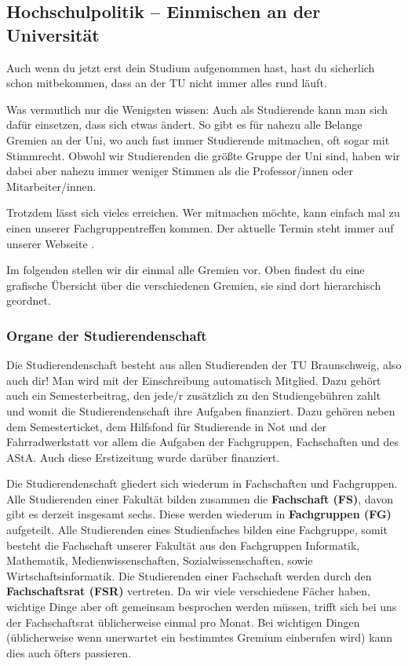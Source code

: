 
\subsection{Hochschulpolitik -- Einmischen an der Universität}

Auch wenn du jetzt erst dein Studium aufgenommen hast, hast du sicherlich schon mitbekommen, dass an der TU nicht immer alles rund läuft.

Was vermutlich nur die Wenigsten wissen: Auch als Studierende kann man sich dafür einsetzen, dass sich etwas ändert. So gibt es für nahezu alle Belange Gremien an der Uni, wo auch fast immer Studierende mitmachen, oft sogar mit Stimmrecht. Obwohl wir Studierenden die größte Gruppe der Uni sind, haben wir dabei aber nahezu immer
weniger Stimmen als die Professor/innen oder Mitarbeiter/innen. 

Trotzdem lässt sich vieles erreichen. Wer mitmachen möchte, kann einfach mal zu einen unserer Fachgruppentreffen kommen. Der aktuelle Termin steht immer auf unserer Webseite \fginfoUrl.

Im folgenden stellen wir dir einmal alle Gremien vor. Oben findest du eine grafische Übersicht über die verschiedenen Gremien, sie sind dort hierarchisch geordnet.

\subsubsection*{Organe der Studierendenschaft}

Die Studierendenschaft besteht aus allen Studierenden der TU Braunschweig, also auch dir!
Man wird mit der Einschreibung automatisch Mitglied. Dazu gehört auch ein Semesterbeitrag, den jede/r zusätzlich zu den Studiengebühren zahlt und womit die Studierendenschaft ihre Aufgaben finanziert. Dazu gehören neben dem Semesterticket, dem Hilfsfond für Studierende in Not und der Fahrradwerkstatt vor allem die Aufgaben der Fachgruppen, Fachschaften und des AStA. Auch diese Erstizeitung wurde darüber finanziert.


Die Studierendenschaft gliedert sich wiederum in Fachschaften und Fachgruppen.
Alle Studierenden einer Fakultät bilden zusammen die \textbf{Fachschaft (FS)}, davon gibt es derzeit insgesamt sechs.
Diese werden wiederum in  \textbf{Fachgruppen (FG)} aufgeteilt. Alle Studierenden eines Studienfaches bilden eine Fachgruppe, somit besteht die Fachschaft unserer Fakultät aus den Fachgruppen Informatik, Mathematik, Medienwissenschaften, Sozialwissenschaften, sowie Wirtschaftsinformatik. Die Studierenden einer Fachschaft werden durch den \textbf{Fachschaftsrat (FSR)} vertreten. Da wir viele verschiedene Fächer haben, wichtige Dinge aber oft gemeinsam besprochen werden müssen, trifft sich bei uns der Fachschaftsrat üblicherweise einmal pro Monat.
Bei wichtigen Dingen (üblicherweise wenn unerwartet ein bestimmtes Gremium einberufen wird) kann dies auch öfters passieren.

